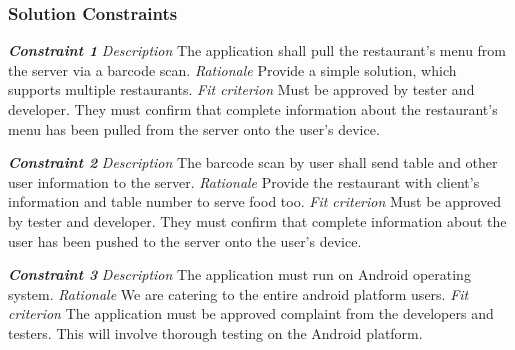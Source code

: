 \documentclass[12pt, titlepage]{article}
\begin{document}
\subsubsection{Solution Constraints}
\textbf{\textit{Constraint 1}}
\newline
\textit{Description}\newline
The application shall pull the restaurant’s menu from the server via a barcode scan.\newline\newline
\textit{Rationale}\newline
Provide a simple solution, which supports multiple restaurants. \newline\newline
\textit{Fit criterion}\newline
Must be approved by tester and developer. They must confirm that complete information about the restaurant’s menu has been pulled from the server onto the user’s device.\newline\newline

\textbf{\textit{Constraint 2}}
\newline
\textit{Description}\newline
The barcode scan by user shall send table and other user information to the server.\newline\newline
\textit{Rationale}\newline
Provide the restaurant with client’s information and table number to serve food too. \newline\newline
\textit{Fit criterion}\newline
Must be approved by tester and developer. They must confirm that complete information about the user has been pushed to the server onto the user’s device.\newline\newline

\textbf{\textit{Constraint 3}}
\newline
\textit{Description}\newline
The application must run on Android operating system. \newline\newline
\textit{Rationale}\newline
We are catering to the entire android platform users. \newline\newline
\textit{Fit criterion}\newline
The application must be approved complaint from the developers and testers. This will involve thorough testing on the Android platform.\newline\newline
\end{document}

